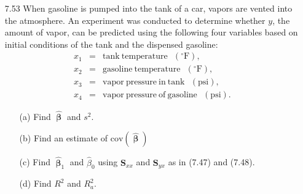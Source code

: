 \documentclass[12pt]{article} %
\begin{document}
\begin{enumerate}
  \item[7.53] When gasoline is pumped into the tank of a car, vapors are vented into the atmosphere. 
  An experiment was conducted to determine whether $y$, the amount of vapor, can be predicted using 
  the following four variables based on initial conditions of the tank and the dispensed gasoline:
  \begin{eqnarray*}
	x_{1}&=&\mathrm{tank~temperature}~~~(^{\circ}\mathrm{F}),\\
        x_{2}&=&\mathrm{gasoline~temperature}~~~(^{\circ}\mathrm{F}),\\
        x_{3}&=&\mathrm{vapor~pressure~in~tank}~~~(\mathrm{psi}),\\
        x_{4}&=&\mathrm{vapor~pressure~of~gasoline}~~~(\mathrm{psi}).
  \end{eqnarray*}
	\begin{enumerate}
	   \item[(a)] Find $\pmb{\hat{\upbeta}}$ and $s^{2}$.
	   \item[(b)] Find an estimate of $\mathrm{cov}(\pmb{\hat{\upbeta}})$
	   \item[(c)] Find $\pmb{\hat{\upbeta}}_{1}$ and $\hat{\beta}_{0}$ using 
           $\mathbf{S}_{xx}$ and $\mathbf{S}_{yx}$ as in (7.47) and (7.48).
	   \item[(d)] Find $R^{2}$ and $R^{2}_{a}$.
	\end{enumerate}
\end{enumerate}
\end{document}

